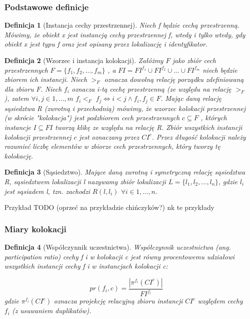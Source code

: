\documentclass[12pt]{article}
\newtheorem{defin}{Definicja}
\begin{document}
\subsubsection{Podstawowe definicje}

\begin{defin}[Instancja cechy przestrzennej]
Niech f będzie cechą przestrzenną. Mówimy, że obiekt x jest instancją cechy przestrzennej f, wtedy i tylko wtedy, gdy obiekt x jest typu f oraz jest opisany przez lokalizację i identyfikator.
\end{defin}

\begin{defin}[Wzorzec i instancja kolokacji]
Załóżmy $F$ jako zbiór cech przestrzennych $F = \{ f_{1}, f_{2}, ...,f_{m} \} $ , a $FI = FI^{f_{1}} \cup FI^{f_{2}} \cup ... \cup FI^{f_{m}}$ niech będzie
zbiorem ich instancji. Niech $ >_{F} $ oznacza dowolną relację porządku zdefiniowaną dla zbioru $ F $. Niech $ f_{i} $ oznacza i-tą cechę przestrzenną (ze względu na relację $ >_{F} $), zatem $ \forall i,j \in 1,...,m $ $ f_{i} <_{F} $ $ f_{j} \Leftrightarrow i < j \land f_{i},f_{j} \in F $. Mając daną relację sąsiedztwa R (zwrotną i przechodnią) mówimy, że wzorzec kolokacji przestrzennej (w skrócie "kolokacja") jest podzbiorem cech przestrzennych $ c \subseteq F $ , których instancje $ I\subseteq FI $ tworzą klikę ze względu na relację R. Zbiór wszystkich instancji kolokacji przestrzennej $c$ jest oznaczany przez $CI^{c} $. Przez długość kolokacji należy rozumieć liczbę elementów w zbiorze cech przestrzennych, który tworzy tę kolokację.
\end{defin}

\begin{defin}[Sąsiedztwo]
Mające daną zwrotną i symetryczną relację sąsiedztwa R, sąsiedztwem lokalizacji l nazywamy zbiór lokalizacji $L = \{l_{1},l_{2}, . . . , l_{n}\}$, gdzie $l_{i}$ jest sąsiadem l, tzn. zachodzi $R(l, l_{i}) $ $ \forall i \in 1,...,n$.
\end{defin}

Przykład TODO (oprzeć na przykładzie chińczyków?) nk te przykłady

\subsubsection{Miary kolokacji}

\begin{defin}[Współczynnik uczestnictwa]
Współczynnik uczestnictwa (ang. participation ratio) cechy f i w kolokacji c jest równy procentowemu udziałowi wszystkich instancji cechy f i w instancjach kolokacji c:

\begin{equation}
pr(f_{i}, c) = \frac{|\pi^{f_{i}}(CI^{c})|}{FI^{f_{i}}}
\end{equation}
gdzie $ \pi^{f_{i}}(CI^{c})$ oznacza projekcję relacyjną zbioru instancji $ CI^{c}$ względem cechy $f_{i}$ (z usuwaniem duplikatów).
\end{defin}
\end{document}
